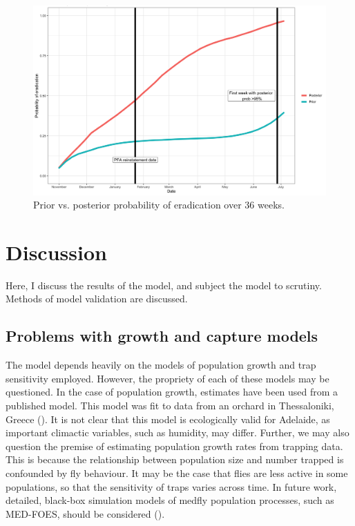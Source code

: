 \documentclass[
  oneside]{book}
\begin{document}
\begin{figure}

{\centering \includegraphics[width=1\linewidth]{results/pfa_criteria_evaluation/prior_vs_post_plot} 

}

\caption{Prior vs. posterior probability of eradication over 36 weeks.}\label{fig:postfig}
\end{figure}

\hypertarget{discussion}{%
\section{Discussion}\label{discussion}}

Here, I discuss the results of the model, and subject the model to scrutiny. Methods of model validation are discussed.

\hypertarget{problems-with-growth-and-capture-models}{%
\subsection{Problems with growth and capture models}\label{problems-with-growth-and-capture-models}}

The model depends heavily on the models of population growth and trap sensitivity employed. However, the propriety of each of these models may be questioned. In the case of population growth, estimates have been used from a published model. This model was fit to data from an orchard in Thessaloniki, Greece (\citet{ks2019}). It is not clear that this model is ecologically valid for Adelaide, as important climactic variables, such as humidity, may differ. Further, we may also question the premise of estimating population growth rates from trapping data. This is because the relationship between population size and number trapped is confounded by fly behaviour. It may be the case that flies are less active in some populations, so that the sensitivity of traps varies across time. In future work, detailed, black-box simulation models of medfly population processes, such as MED-FOES, should be considered (\citet{manoukis2014}).
\end{document}
